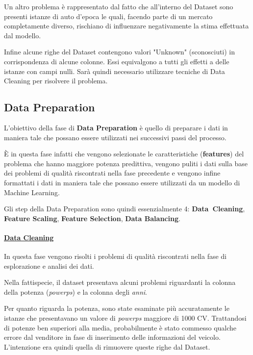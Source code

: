 Un altro problema è rappresentato dal fatto che all'interno del Dataset sono presenti istanze di auto d'epoca le quali, facendo parte di un mercato completamente diverso, rischiano di influenzare negativamente la stima effettuata dal modello. 

Infine alcune righe del Dataset contengono valori "Unknown" (sconosciuti) in corrispondenza di alcune colonne. Essi equivalgono a tutti gli effetti a delle istanze con campi nulli. Sarà quindi necessario utilizzare tecniche di Data Cleaning per risolvere il problema.
\medskip

\subsection{Data Preparation}
L'obiettivo della fase di \textbf{Data Preparation} è quello di preparare i dati in maniera tale che possano essere utilizzati nei successivi passi del processo.

È in questa fase infatti che vengono selezionate le caratteristiche (\textbf{features}) del problema che hanno maggiore potenza predittiva, vengono puliti i dati sulla base dei problemi di qualità riscontrati nella fase precedente e vengono infine formattati i dati in maniera tale che possano essere utilizzati da un modello di Machine Learning.

\noindent Gli step della Data Preparation sono quindi essenzialmente 4: \mbox{\textbf{Data Cleaning}}, \textbf{Feature Scaling}, \textbf{Feature Selection}, \textbf{Data Balancing}.
\bigskip
\bigskip

\paragraph{\textcolor[HTML]{000099}{\underline{Data Cleaning}}}
In questa fase vengono risolti i problemi di qualità riscontrati nella fase di esplorazione e analisi dei dati.

Nella fattispecie, il dataset presentava alcuni problemi riguardanti la colonna della potenza (\textit{power\textunderscore ps}) e la colonna degli \textit{anni}.

Per quanto riguarda la potenza, sono state esaminate più accuratamente le istanze che presentavano un valore di \textit{power\textunderscore ps} maggiore di 1000 CV. Trattandosi di potenze ben superiori alla media, probabilmente è stato commesso qualche errore dal venditore in fase di inserimento delle informazioni del veicolo. L'intenzione era quindi quella di rimuovere queste righe dal Dataset.

